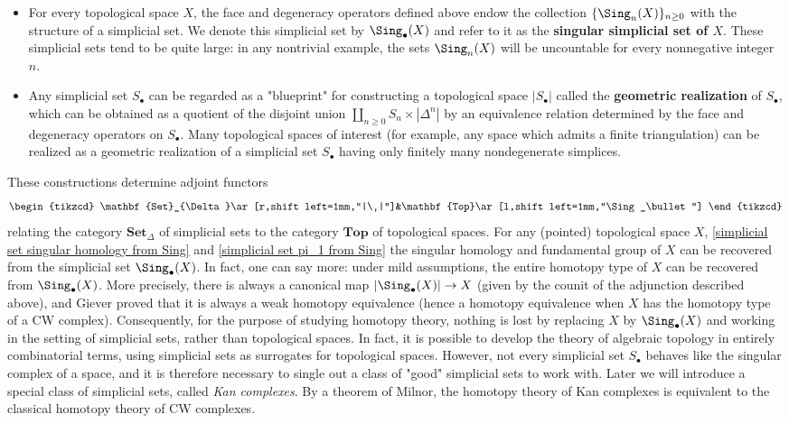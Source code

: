\begin{itemize}
\item For every topological space $X$, the face and degeneracy operators defined above endow the collection $\{\Sing_n(X)\}_{n\geq 0}$ with the structure of a simplicial set. We denote this simplicial set by $\Sing_\bullet(X)$ and refer to it as the \textbf{singular simplicial set of $X$}. These simplicial sets tend to be quite large: in any nontrivial example, the sets $\Sing_n(X)$ will be uncountable for every nonnegative integer $n$.
\item Any simplicial set $S_\bullet$ can be regarded as a "blueprint" for constructing a topological space $|S_\bullet|$ called the \textbf{geometric realization} of $S_\bullet$, which can be obtained as a quotient of the disjoint union $\coprod_{n\geq 0}S_n\times|\Delta^n|$ by an equivalence relation determined by the face and degeneracy operators on $S_\bullet$. Many topological spaces of interest (for example, any space which admits a finite triangulation) can be realized as a geometric realization of a simplicial set $S_\bullet$ having only finitely many nondegenerate simplices.
\end{itemize}
These constructions determine adjoint functors
\[\begin{tikzcd}
\mathbf{Set}_{\Delta}\ar[r,shift left=1mm,"|\ |"]&\mathbf{Top}\ar[l,shift left=1mm,"\Sing_\bullet"]
\end{tikzcd}\]
relating the category $\mathbf{Set}_\Delta$ of simplicial sets to the category $\mathbf{Top}$ of topological spaces. For any (pointed) topological space $X$, \cref{simplicial set singular homology from Sing} and \cref{simplicial set pi_1 from Sing} the singular homology and fundamental group of $X$ can be recovered from the simplicial set $\Sing_\bullet(X)$. In fact, one can say more: under mild assumptions, the entire homotopy type of $X$ can be recovered from $\Sing_\bullet(X)$. More precisely, there is always a canonical map $|\Sing_\bullet(X)|\to X$ (given by the counit of the adjunction described above), and Giever proved that it is always a weak homotopy equivalence (hence a homotopy equivalence when $X$ has the homotopy type of a CW complex). Consequently, for the purpose of studying homotopy theory, nothing is lost by replacing $X$ by $\Sing_\bullet(X)$ and working in the setting of simplicial sets, rather than topological spaces. In fact, it is possible to develop the theory of algebraic topology in entirely combinatorial terms, using simplicial sets as surrogates for topological spaces. However, not every simplicial set $S_\bullet$ behaves like the singular complex of a space, and it is therefore necessary to single out a class of "good" simplicial sets to work with. Later we will introduce a special class of simplicial sets, called \textit{Kan complexes}. By a theorem of Milnor, the homotopy theory of Kan complexes is equivalent to the classical homotopy theory of CW complexes.
